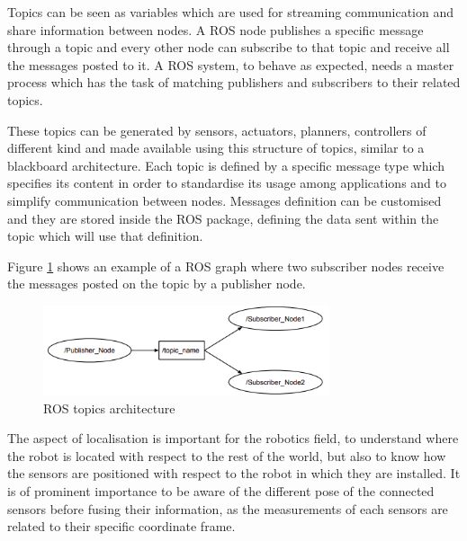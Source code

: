 Topics can be seen as variables which are used for streaming communication and share information between nodes.
A \Gls{ROS} node publishes a specific message through a topic and every other node can subscribe to that topic and receive all the messages posted to it.
A \Gls{ROS} system, to behave as expected, needs a master process which has the task of matching publishers and subscribers to their related topics.

These topics can be generated by sensors, actuators, planners, controllers of different kind and made available using this structure of topics, similar to a blackboard architecture.
Each topic is defined by a specific message type which specifies its content in order to standardise its usage among applications and to simplify communication between nodes.
Messages definition can be customised and they are stored inside the \Gls{ROS} package, defining the data sent within the topic which will use that definition.

Figure \ref{fig:ros-topic} shows an example of a \Gls{ROS} graph where two subscriber nodes receive the messages posted on the topic by a publisher node.

\begin{figure}[!ht]
	\begin{center}
		\includegraphics[width=0.75\textwidth]{Images/2-Background/ROSTopic-2021-04-22 10-51-37.png}
	\end{center}
	\caption{\Gls{ROS} topics architecture}%
	\label{fig:ros-topic}
\end{figure}

The aspect of localisation is important for the robotics field, to understand where the robot is located with respect to the rest of the world, but also to know how the sensors are positioned with respect to the robot in which they are installed.
It is of prominent importance to be aware of the different pose of the connected sensors before fusing their information, as the measurements of each sensors are related to their specific coordinate frame.

